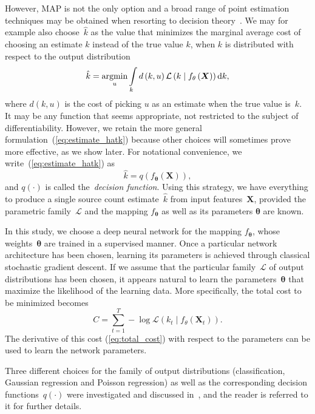 However, MAP is not the only option and a broad range of point estimation techniques may be obtained when resorting to decision theory~\cite{berger1985}.
We may for example also choose~$\hat{k}$ as the value that minimizes the marginal average cost of choosing an estimate $\hat{k}$ instead of the true value $k$, when $k$ is distributed with respect to the output distribution
\begin{equation}
\hat{k}=\underset{u}{\text{argmin}}\intop_{k}d\left(k,u\right)\mathcal{L}\left(k\mid f_{\mathbf{\theta}}\left(\boldsymbol{X}\right)\right) \mathrm{d} k,\label{eq:estimate_hatk}
\end{equation}
where $d\left(k,u\right)$ is the cost of picking $u$ as an estimate when the true value is~$k$.
It may be any function that seems appropriate, not restricted to the subject of differentiability.
However, we retain the more general formulation~(\ref{eq:estimate_hatk}) because other choices will sometimes prove more effective, as we show later.
For notational convenience, we write~(\ref{eq:estimate_hatk}) as
\begin{equation}
\hat{k}=q\left(f_{\mathbf{\theta}}\left(\boldsymbol{X}\right)\right),
\end{equation}
and $q\left(\cdot\right)$ is called the~\textit{decision function}.
Using this strategy, we have everything to produce a single source count estimate~$\hat{k}$ from input features~$\mathbf{X}$, provided the parametric family~$\mathcal{L}$ and the mapping $f_{\mathbf{\theta}}$ as well as its parameters $\mathbf{\theta}$ are known.

In this study, we choose a deep neural network for the mapping $f_{\mathbf{\theta}}$, whose weights~$\mathbf{\theta}$ are trained in a supervised manner.
Once a particular network architecture has been chosen, learning its parameters is achieved through classical stochastic gradient descent.
If we assume that the particular family~$\mathcal{L}$ of output distributions has been chosen, it appears natural to learn the parameters~$\mathbf{\theta}$ that maximize the likelihood of the learning data.
More specifically, the total cost to be minimized becomes
\begin{equation}
C=\sum_{t=1}^{T}-\log\mathcal{L}\left(k_{t}\mid f_{\theta}\left(\boldsymbol{X}_{t}\right)\right).\label{eq:total_cost}
\end{equation}
The derivative of this cost (\ref{eq:total_cost}) with respect to the parameters can be used to learn the network parameters.
\par
Three different choices for the family of output distributions (classification, Gaussian regression and Poisson regression) as well as the corresponding decision functions~$q\left(\cdot\right)$ were investigated and discussed in~\cite{stoeter17}, and the reader is referred to it for further details.


